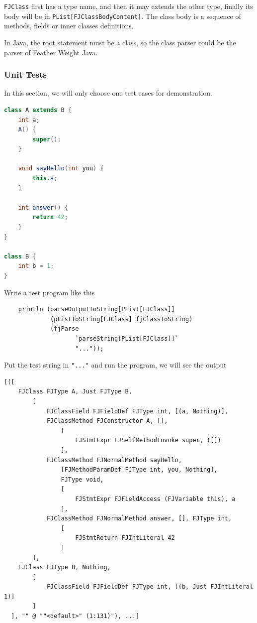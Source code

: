\texttt{FJClass} first has a type name, and then it may extends the other type, finally its body will be in \texttt{PList[FJClassBodyContent]}. The class body is a sequence of methods, fields or inner classes definitions.

In Java, the root statement must be a class, so the class parser could be the parser of Feather Weight Java.

\subsubsection{Unit Tests}

In this section, we will only choose one test cases for demonstration.

\begin{lstlisting}[language=Java]
class A extends B {
    int a;
    A() {
        super();
    }

    void sayHello(int you) {
        this.a;
    }

    int answer() {
        return 42;
    }
}

class B {
    int b = 1;
}
\end{lstlisting}

Write a test program like this

\begin{lstlisting}
    println (parseOutputToString[PList[FJClass]]
             (pListToString[FJClass] fjClassToString)
             (fjParse
                    `parseString[PList[FJClass]]`
                    "..."));
\end{lstlisting}

Put the test string in \texttt{"..."} and run the program, we will see the output

\begin{lstlisting}
[([
    FJClass FJType A, Just FJType B,
        [
            FJClassField FJFieldDef FJType int, [(a, Nothing)],
            FJClassMethod FJConstructor A, [],
                [
                    FJStmtExpr FJSelfMethodInvoke super, ([])
                ],
            FJClassMethod FJNormalMethod sayHello,
                [FJMethodParamDef FJType int, you, Nothing],
                FJType void,
                [
                    FJStmtExpr FJFieldAccess (FJVariable this), a
                ],
            FJClassMethod FJNormalMethod answer, [], FJType int,
                [
                    FJStmtReturn FJIntLiteral 42
                ]
        ],
    FJClass FJType B, Nothing,
        [
            FJClassField FJFieldDef FJType int, [(b, Just FJIntLiteral 1)]
        ]
  ], "" @ ""<default>" (1:131)"), ...]
\end{lstlisting}

